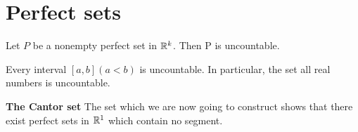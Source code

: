 \section{Perfect sets}


\begin{thm}\label{thm:2.43}
    Let $P$ be a nonempty perfect set in ${\protect\mathbb R}^k$. Then P is uncountable.    
\end{thm}





\begin{myCorollary}
	Every interval $[a, b] (a <b)$ is uncountable. In particular, the set
	all real numbers is uncountable.
\end{myCorollary}


\begin{myDef}
	\textbf{The Cantor set} The set which we are now going to construct shows
	that there exist perfect sets in ${\protect\mathbb R}^{1}$ which contain no segment.
\end{myDef}


